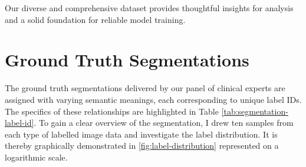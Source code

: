 Our diverse and comprehensive dataset provides thoughtful insights for analysis and a solid foundation for reliable model training.

\section{Ground Truth Segmentations}

The ground truth segmentations delivered by our panel of clinical experts are assigned with varying semantic meanings, each corresponding to unique label IDs. The specifics of these relationships are highlighted in Table \ref{tab:segmentation-label-id}. To gain a clear overview of the segmentation, I drew ten samples from each type of labelled image data and investigate the label distribution. It is thereby graphically demonstrated in \autoref{fig:label-distribution} represented on a logarithmic scale.

